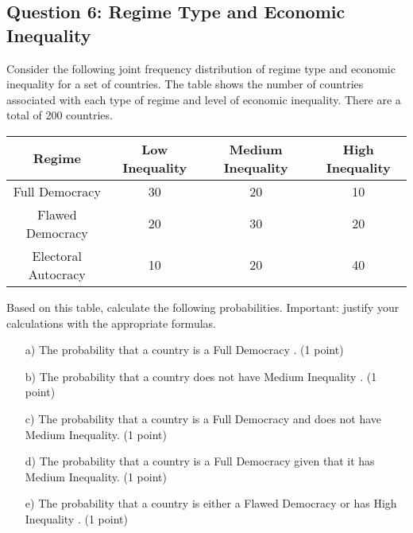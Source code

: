 \documentclass{article}
\begin{document}
\subsection*{Question 6: Regime Type and Economic Inequality}

Consider the following joint frequency distribution of regime type and economic inequality for a set of countries. The table shows the number of countries associated with each type of regime and level of economic inequality. There are a total of 200 countries.

\begin{table}[h!]
\centering
\begin{tabular}{|c|c|c|c|}
\hline
Regime & Low Inequality & Medium Inequality & High Inequality \\
\hline
Full Democracy & 30 & 20 & 10 \\ %
\hline
Flawed Democracy & 20 & 30 & 20 \\ %
\hline
Electoral Autocracy  & 10 & 20 & 40 \\ %
\hline
\end{tabular}
\end{table}

Based on this table, calculate the following probabilities. Important: justify your calculations with the appropriate formulas.

\begin{enumerate}
    \item[a)] The probability that a country is a Full Democracy . (1 point)
    \item[b)] The probability that a country does not have Medium Inequality . (1 point)
    \item[c)] The probability that a country is a Full Democracy and does not have Medium Inequality. (1 point)
    \item[d)] The probability that a country is a Full Democracy given that it has Medium Inequality. (1 point)
    \item[e)] The probability that a country is either a Flawed Democracy or has High Inequality . (1 point)
\end{enumerate}
\end{document}
